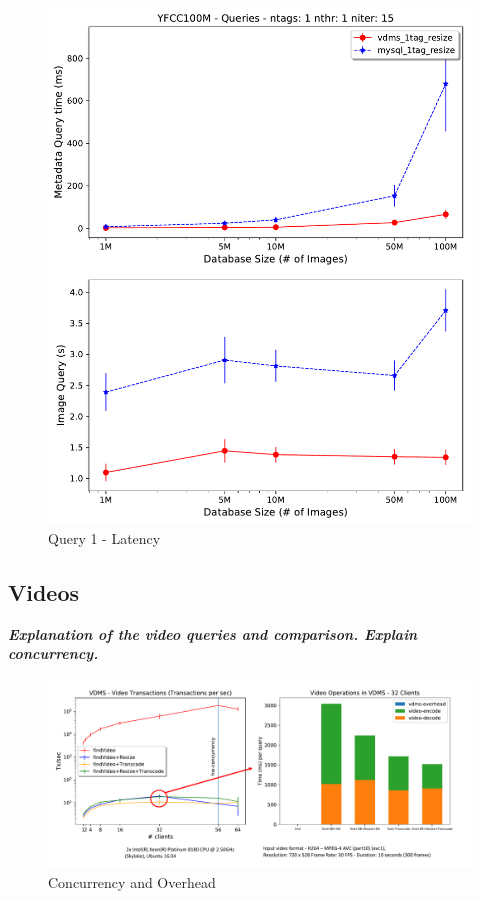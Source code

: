 \begin{figure}[]
\centering
\includegraphics[width=\columnwidth]{figures/q1_latency}
\caption{Query 1 - Latency}
\label{fig:q1_latency}
\end{figure}


\subsection{Videos}

\textbf{\textit{Explanation of the video queries and comparison.
Explain concurrency.}}

\begin{figure}[]
\centering
\includegraphics[width=\textwidth]{figures/video_overhead}
\caption{Concurrency and Overhead}
\label{fig:video}
\end{figure}

